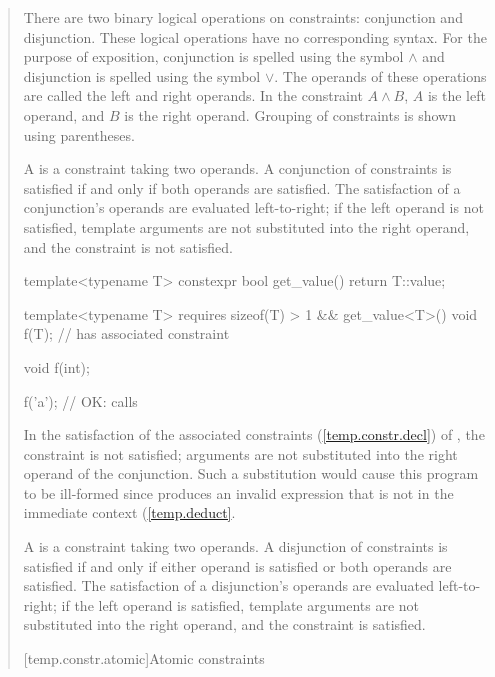 \begin{quote}
\begin{addedblock}
\pnum
There are two binary logical operations on constraints: conjunction
and disjunction.
% 
\enternote 
These logical operations have no corresponding \Cpp syntax.
For the purpose of exposition, conjunction is spelled
using the symbol $\land$ and disjunction is spelled using the 
symbol $\lor$. 
% 
The operands of these operations are called the left 
and right operands. In the constraint $A \land B$,
$A$ is the left operand, and $B$ is the right operand.
% 
Grouping of constraints is shown using parentheses.
\exitnote

\pnum
A  is a constraint taking two 
operands. A conjunction of constraints is satisfied if and only 
if both operands are satisfied. 
% 
The satisfaction of a conjunction's operands are evaluated left-to-right; 
if the left operand is not satisfied, template arguments are not 
substituted into the right operand, and the constraint is not satisfied.
% 
\enterexample
\begin{codeblock}
template<typename T>
  constexpr bool get_value() { return T::value; }

template<typename T>
  requires sizeof(T) > 1 && get_value<T>()
    void f(T);   // has associated constraint 

void f(int);

f('a'); // OK: calls 
\end{codeblock}
In the satisfaction of the associated constraints (\ref{temp.constr.decl}) 
of , the constraint  is not satisfied; 
arguments are not substituted into the right operand of the conjunction.
% 
Such a substitution would cause this program to be ill-formed since 
 produces an invalid expression that is not in
the immediate context (\ref{temp.deduct}.
\exitexample

\pnum
A  is a constraint taking two 
operands. A disjunction of constraints is satisfied if and only 
if either operand is satisfied or both operands are satisfied.
% 
The satisfaction of a disjunction's operands are evaluated left-to-right; 
if the left operand is satisfied, template arguments are not 
substituted into the right operand, and the constraint is satisfied.


[temp.constr.atomic]{Atomic constraints}


\end{addedblock}
\end{quote}
